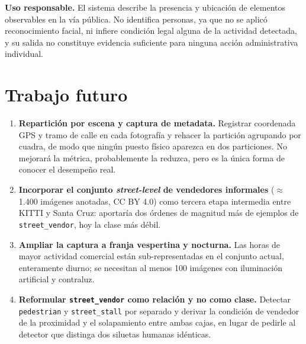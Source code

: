 \documentclass[10pt,a4paper]{article}
\begin{document}
\textbf{Uso responsable.} El sistema describe la presencia y ubicación de elementos
observables en la vía pública. No identifica personas, ya que no se aplicó reconocimiento
facial, ni infiere condición legal alguna de la actividad detectada, y su salida no
constituye evidencia suficiente para ninguna acción administrativa individual.

\section{Trabajo futuro}
\begin{enumerate}[leftmargin=*]
  \item \textbf{Repartición por escena y captura de metadata.} Registrar coordenada GPS y
        tramo de calle en cada fotografía y rehacer la partición agrupando por cuadra, de
        modo que ningún puesto físico aparezca en dos particiones. No mejorará la métrica,
        probablemente la reduzca, pero es la única forma de conocer el desempeño real.
  \item \textbf{Incorporar el conjunto \emph{street-level} de vendedores informales}
        \cite{streetlevel} ($\approx$1{.}400 imágenes anotadas, CC BY 4.0) como tercera
        etapa intermedia entre KITTI y Santa Cruz: aportaría dos órdenes de magnitud más
        de ejemplos de \texttt{street\_vendor}, hoy la clase más débil.
  \item \textbf{Ampliar la captura a franja vespertina y nocturna.} Las horas de mayor
        actividad comercial están sub-representadas en el conjunto actual, enteramente
        diurno; se necesitan al menos 100 imágenes con iluminación artificial y contraluz.
  \item \textbf{Reformular \texttt{street\_vendor} como relación y no como clase.}
        Detectar \texttt{pedestrian} y \texttt{street\_stall} por separado y derivar la
        condición de vendedor de la proximidad y el solapamiento entre ambas cajas, en
        lugar de pedirle al detector que distinga dos siluetas humanas idénticas.
\end{enumerate}

\end{document}

